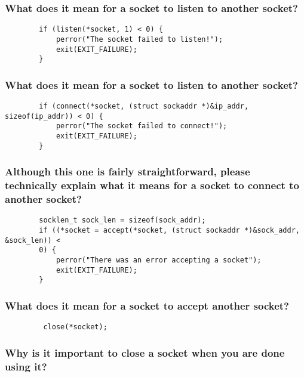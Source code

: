 \documentclass{article}
\begin{document}
	\subsubsection{What does it mean for a socket to listen to another socket?}
	\vspace{72pt}
	
	\begin{lstlisting}
		if (listen(*socket, 1) < 0) {
			perror("The socket failed to listen!");
			exit(EXIT_FAILURE);
		}
	\end{lstlisting}
	
	\subsubsection{What does it mean for a socket to listen to another socket?}
	\vspace{72pt}
	
	\begin{lstlisting}
		if (connect(*socket, (struct sockaddr *)&ip_addr, sizeof(ip_addr)) < 0) {
			perror("The socket failed to connect!");
			exit(EXIT_FAILURE);
		}
	\end{lstlisting}
	
	\subsubsection{Although this one is fairly straightforward, please technically explain what it means for a socket to connect to another socket?}
	\vspace{72pt}
	
	\begin{lstlisting}
		socklen_t sock_len = sizeof(sock_addr);
		if ((*socket = accept(*socket, (struct sockaddr *)&sock_addr, &sock_len)) <
		0) {
			perror("There was an error accepting a socket");
			exit(EXIT_FAILURE);
		}
	\end{lstlisting}
	
	\subsubsection{What does it mean for a socket to accept another socket?}
	\vspace{72pt}
	
	\begin{lstlisting}
		 close(*socket);
	\end{lstlisting}
	
	\subsubsection{Why is it important to close a socket when you are done using it?}
	\vspace{72pt}
	\pagebreak{}
	
\end{document}
